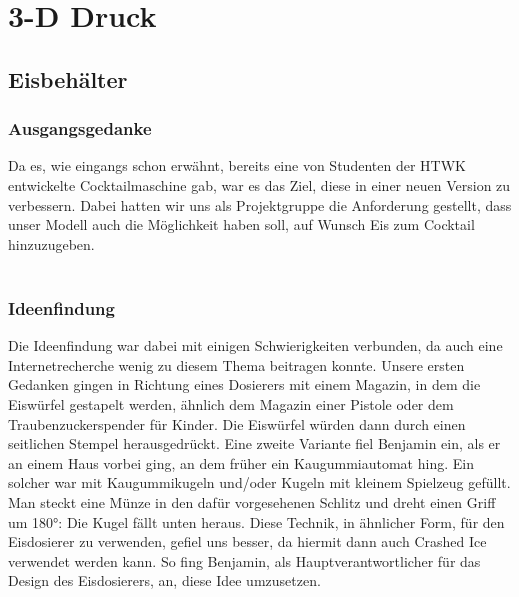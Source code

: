 \documentclass[10pt,a4paper]{report}
\begin{document}
	\chapter{3-D Druck}
	
	\section{Eisbehälter}
	
	\subsection{Ausgangsgedanke}
	Da es, wie eingangs schon erwähnt, bereits eine von Studenten der HTWK entwickelte
	Cocktailmaschine gab, war es das Ziel, diese in einer neuen Version zu verbessern. Dabei
	hatten wir uns als Projektgruppe die Anforderung gestellt, dass unser Modell auch die
	Möglichkeit haben soll, auf Wunsch Eis zum Cocktail hinzuzugeben.\\\\
	
	\subsection{Ideenfindung}
	Die Ideenfindung war dabei mit einigen Schwierigkeiten verbunden, da auch eine
	Internetrecherche wenig zu diesem Thema beitragen konnte.
	Unsere ersten Gedanken gingen in Richtung eines Dosierers mit einem Magazin, in dem die
	Eiswürfel gestapelt werden, ähnlich dem Magazin einer Pistole oder dem
	Traubenzuckerspender für Kinder. Die Eiswürfel würden dann durch einen seitlichen Stempel
	herausgedrückt.
	Eine zweite Variante fiel Benjamin ein, als er an einem Haus vorbei ging, an dem früher ein
	Kaugummiautomat hing. Ein solcher war mit Kaugummikugeln und/oder Kugeln mit kleinem
	Spielzeug gefüllt. Man steckt eine Münze in den dafür vorgesehenen Schlitz und dreht einen
	Griff um 180°: Die Kugel fällt unten heraus.
	Diese Technik, in ähnlicher Form, für den Eisdosierer zu verwenden, gefiel uns besser, da
	hiermit dann auch Crashed Ice verwendet werden kann.
	So fing Benjamin, als Hauptverantwortlicher für das Design des Eisdosierers, an, diese Idee
	umzusetzen. \\\\
	
\end{document}
